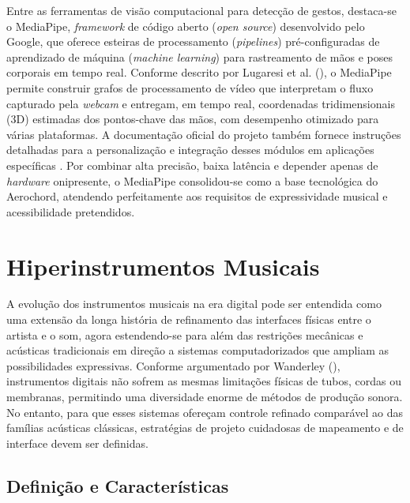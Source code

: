 Entre as ferramentas de visão computacional para detecção de gestos, destaca-se o MediaPipe, \textit{framework} de código aberto (\textit{open source}) desenvolvido pelo Google, que oferece esteiras de processamento (\textit{pipelines}) pré-configuradas de aprendizado de máquina (\textit{machine learning}) para rastreamento de mãos e poses corporais em tempo real. Conforme descrito por Lugaresi et al. (\citeyear{lugaresi2019mediapipe}), o MediaPipe permite construir grafos de processamento de vídeo que interpretam o fluxo capturado pela \textit{webcam} e entregam, em tempo real, coordenadas tridimensionais (3D) estimadas dos pontos-chave das mãos, com desempenho otimizado para várias plataformas. A documentação oficial do projeto também fornece instruções detalhadas para a personalização e integração desses módulos em aplicações específicas \cite{mediapipeWebsite}. Por combinar alta precisão, baixa latência e depender apenas de \textit{hardware} onipresente, o MediaPipe consolidou-se como a base tecnológica do Aerochord, atendendo perfeitamente aos requisitos de expressividade musical e acessibilidade pretendidos.

\section{Hiperinstrumentos Musicais}
\label{sec:hiperinstrumentos_musicais}

A evolução dos instrumentos musicais na era digital pode ser entendida como uma extensão da longa história de refinamento das interfaces físicas entre o artista e o som, agora estendendo-se para além das restrições mecânicas e acústicas tradicionais em direção a sistemas computadorizados que ampliam as possibilidades expressivas. Conforme argumentado por Wanderley (\citeyear{wanderley2001gestural}), instrumentos digitais não sofrem as mesmas limitações físicas de tubos, cordas ou membranas, permitindo uma diversidade enorme de métodos de produção sonora. No entanto, para que esses sistemas ofereçam controle refinado comparável ao das famílias acústicas clássicas, estratégias de projeto cuidadosas de mapeamento e de interface devem ser definidas.

\subsection{Definição e Características}
\label{sec:definicao_e_caracteristicas}

